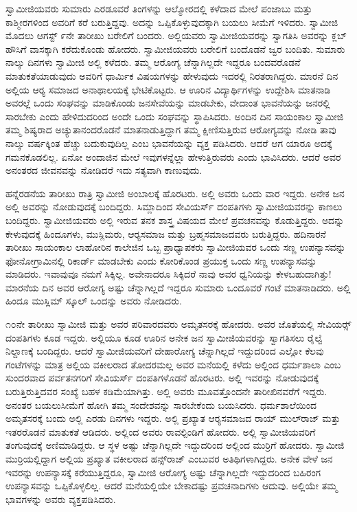  ಸ್ವಾಮೀಜಿಯವರು ಸುಮಾರು ಎರಡೂವರೆ ತಿಂಗಳನ್ನು ಆಲ್ಮೋರದಲ್ಲಿ ಕಳೆದಾದ ಮೇಲೆ ಪಂಜಾಬು ಮತ್ತು ಕಾಶ್ಮೀರಗಳಿಂದ ಅವರಿಗೆ ಕರೆ ಬರುತ್ತಿದ್ದವು. ಅದನ್ನು ಒಪ್ಪಿಕೊಳ್ಳುವುದಕ್ಕಾಗಿ ಬಯಲು ಸೀಮೆಗೆ ಇಳಿದರು. ಸ್ವಾಮೀಜಿ ಮೊದಲು ಆಗಸ್ಟ್ ೯ನೇ ತಾರೀಖು ಬರೇಲಿಗೆ ಬಂದರು. ಅಲ್ಲಿಯವರು ಸ್ವಾಮೀಜಿಯವರನ್ನು ಸ್ವಾಗತಿಸಿ ಅವರನ್ನು ಕ್ಲಬ್ ಹೌಸಿಗೆ ವಾಸಕ್ಕಾಗಿ ಕರೆದುಕೊಂಡು ಹೋದರು. ಸ್ವಾಮೀಜಿಯವರು ಬರೇಲಿಗೆ ಬಂದೊಡನೆ ಜ್ವರ ಬಂದಿತು. ಸುಮಾರು ನಾಲ್ಕು ದಿನಗಳು ಸ್ವಾಮೀಜಿ ಅಲ್ಲಿ ಕಳೆದರು. ತಮ್ಮ ಆರೋಗ್ಯ ಚೆನ್ನಾಗಿಲ್ಲದೇ ಇದ್ದರೂ ಬಂದವರೊಡನೆ ಮಾತುಕತೆಯಾಡುವುದು ಅವರಿಗೆ ಧಾರ್ಮಿಕ ವಿಷಯಗಳನ್ನು ಹೇಳುವುದು ಇದರಲ್ಲಿ ನಿರತರಾಗಿದ್ದರು. ಮಾರನೆ ದಿನ ಅಲ್ಲಿಯ ಆರ‍್ಯ ಸಮಾಜದ ಅನಾಥಾಲಯಕ್ಕೆ ಭೇಟಿಕೊಟ್ಟರು. ಆ ಊರಿನ ವಿದ್ಯಾರ್ಥಿಗಳನ್ನು ಉದ್ದೇಶಿಸಿ ಮಾತನಾಡಿ ಅವರಲ್ಲೆ ಒಂದು ಸಂಘವನ್ನು ಮಾಡಿಕೊಂಡು ಜನಸೇವೆಯನ್ನು ಮಾಡಬೇಕು, ವೇದಾಂತ ಭಾವನೆಯನ್ನು ಜನರಲ್ಲಿ ಸಾರಬೇಕು ಎಂದು ಹೇಳಿದುದರಿಂದ ಅಂದೇ ಒಂದು ಸಂಘವನ್ನು ಸ್ಥಾಪಿಸಿದರು. ಅಂದಿನ ದಿನ ಸಾಯಂಕಾಲ ಸ್ವಾಮೀಜಿ ತಮ್ಮ ಶಿಷ್ಯರಾದ ಅಚ್ಯುತಾನಂದರೊಡನೆ ಮಾತನಾಡುತ್ತಿದ್ದಾಗ ತಮ್ಮ ಕ್ಷೀಣಿಸುತ್ತಿರುವ ಆರೋಗ್ಯವನ್ನು ನೋಡಿ ತಾವು ನಾಲ್ಕು ವರ್ಷಕ್ಕಿಂತ ಹೆಚ್ಚು ಬದುಕುವುದಿಲ್ಲ ಎಂಬ ಭಾವನೆಯನ್ನು ವ್ಯಕ್ತ ಪಡಿಸಿದರು. ಆದರೆ ಆಗ ಯಾರೂ ಅದಕ್ಕೆ ಗಮನಕೊಡಲಿಲ್ಲ. ಏನೋ ಅಂದಾಜಿನ ಮೇಲೆ ಇವುಗಳನ್ನೆಲ್ಲಾ ಹೇಳುತ್ತಿರುವರು ಎಂದು ಭಾವಿಸಿದರು. ಆದರೆ ಅವರ ಅನಂತರದ ಜೀವನವನ್ನು ನೋಡಿದರೆ ಇದು ಸತ್ಯವಾಗಿ ಕಾಣುವುದು. 

 ಹನ್ನೆರಡನೆಯ ತಾರೀಖು ರಾತ್ರಿ ಸ್ವಾಮೀಜಿ ಅಂಬಾಲಕ್ಕೆ ಹೊರಟರು. ಅಲ್ಲಿ ಅವರು ಒಂದು ವಾರ ಇದ್ದರು. ಅನೇಕ ಜನ ಅಲ್ಲಿ ಅವರನ್ನು ನೋಡುವುದಕ್ಕೆ ಬಂದಿದ್ದರು. ಸಿಮ್ಲಾದಿಂದ ಸೇವಿಯರ್ಸ್ ದಂಪತಿಗಳು ಸ್ವಾಮೀಜಿಯವರನ್ನು ಕಾಣಲು ಬಂದಿದ್ದರು. ಸ್ವಾಮೀಜಿಯವರು ಅಲ್ಲಿ ಇರುವ ತನಕ ಶಾಸ್ತ್ರ ವಿಷಯದ ಮೇಲೆ ಪ್ರವಚನವನ್ನು ಕೊಡುತ್ತಿದ್ದರು. ಅದನ್ನು ಕೇಳುವುದಕ್ಕೆ ಹಿಂದೂಗಳು, ಮುಸ್ಲಿಮರು, ಆರ‍್ಯಸಮಾಜ ಮತ್ತು ಬ್ರಹ್ಮಸಮಾಜದವರು ಬರುತ್ತಿದ್ದರು. ಹದಿನಾರನೆ ತಾರೀಖು ಸಾಯಂಕಾಲ ಲಾಹೋರಿನ ಕಾಲೇಜಿನ ಒಬ್ಬ ಪ್ರಾಧ್ಯಾಪಕರು ಸ್ವಾಮೀಜಿಯವರ ಒಂದು ಸಣ್ಣ ಉಪನ್ಯಾಸವನ್ನು ಫೋನೋಗ್ರಾಮಿನಲ್ಲಿ ರಿಕಾರ್ಡ್ ಮಾಡಬೇಕು ಎಂದು ಕೋರಿಕೊಂಡ ಪ್ರಯುಕ್ತ ಒಂದು ಸಣ್ಣ ಉಪನ್ಯಾಸವನ್ನು ಮಾಡಿದರು. ಇವಾವುವೂ ನಮಗೆ ಸಿಕ್ಕಿಲ್ಲ. ಅವೇನಾದರೂ ಸಿಕ್ಕಿದರೆ ನಾವು ಅವರ ಧ್ವನಿಯನ್ನು ಕೇಳಬಹುದಾಗಿತ್ತು! ಮಾರನೆಯ ದಿನ ಅವರ ಆರೋಗ್ಯ ಅಷ್ಟು ಚೆನ್ನಾಗಿಲ್ಲದೆ ಇದ್ದರೂ ಸುಮಾರು ಒಂದೂವರೆ ಗಂಟೆ ಮಾತನಾಡಿದರು. ಅಲ್ಲಿ ಹಿಂದೂ ಮುಸ್ಲಿಮ್ ಸ್ಕೂಲ್ ಒಂದನ್ನು ಅವರು ನೋಡಿದರು. 

 ೧೦ನೇ ತಾರೀಖು ಸ್ವಾಮೀಜಿ ಮತ್ತು ಅವರ ಪರಿವಾರದವರು ಅಮೃತಸರಕ್ಕೆ ಹೋದರು. ಅವರ ಜೊತೆಯಲ್ಲಿ ಸೇವಿಯರ್ಸ್‍‍ ದಂಪತಿಗಳು ಕೂಡ ಇದ್ದರು. ಅಲ್ಲಿಯೂ ಕೂಡ ಊರಿನ ಅನೇಕ ಜನ ಸ್ವಾಮೀಜಿಯವರನ್ನು ಸ್ವಾಗತಿಸಲು ರೈಲ್ವೆ ನಿಲ್ದಾಣಕ್ಕೆ ಬಂದಿದ್ದರು. ಆದರೆ ಸ್ವಾಮೀಜಿಯವರಿಗೆ ದೇಹಾರೋಗ್ಯ ಚೆನ್ನಾಗಿಲ್ಲದೆ ಇದ್ದುದರಿಂದ ಎಲ್ಲೋ ಕೆಲವು ಗಂಟೆಗಳನ್ನು ಮಾತ್ರ ಅಲ್ಲಿಯ ವಕೀಲರಾದ ತೋದರಮಲ್ಲ ಅವರ ಮನೆಯಲ್ಲಿ ಕಳೆದು ಅಲ್ಲಿಂದ ಧರ್ಮಶಾಲಾ ಎಂಬ ಸುಂದರವಾದ ಪರ್ವತನಗರಿಗೆ ಸೇವಿಯರ್ಸ್ ದಂಪತಿಗಳೊಡನೆ ಹೊರಟರು. ಅಲ್ಲಿ ಇವರನ್ನು ನೋಡುವುದಕ್ಕೆ ಬರುತ್ತಿರುತ್ತಿದವರ ಸಂಖ್ಯೆ ಬಹಳ ಕಡಿಮೆಯಾಗಿತ್ತು. ಅಲ್ಲಿ ಅವರು ಮೂವತ್ತೊಂದನೇ ತಾರೀಖಿನವರೆಗೆ ಇದ್ದರು. ಅನಂತರ ಬಯಲುಸೀಮೆಗೆ ಹೋಗಿ ತಮ್ಮ ಸಂದೇಶವನ್ನು ಸಾರಬೇಕೆಂದು ಬಯಸಿದರು. ಧರ್ಮಶಾಲೆಯಿಂದ ಅಮೃತಸರಕ್ಕೆ ಬಂದು ಅಲ್ಲಿ ಎರಡು ದಿನಗಳು ಇದ್ದರು. ಅಲ್ಲಿ ಪ್ರಖ್ಯಾತ ಆರ‍್ಯಸಮಾಜದ ರಾಯ್ ಮುಲ್‍ರಾಜ್ ಮತ್ತು ಇತರರೊಡನೆ ಮಾತುಕತೆ ಆಡಿದರು. ಅಲ್ಲಿಂದ ಅವರು ರಾವಲ್ಪಿಂಡಿಗೆ ಹೋದರು. ಅಲ್ಲಿ ಸ್ವಾಮೀಜಿಯವರಿಗೆ ತಂಗುವುದಕ್ಕೆ ಅಣಿಮಾಡಿದ್ದರು. ಆ ಸ್ಥಳ ಅಷ್ಟು ಚೆನ್ನಾಗಿಲ್ಲದೇ ಇದ್ದುದರಿಂದ ಅಲ್ಲಿಂದ ಮುರ‍್ರಿಗೆ ಹೋದರು. ಸ್ವಾಮೀಜಿ ಮುರ‍್ರಿಯಲ್ಲಿದ್ದಾಗ ಅಲ್ಲಿಯ ಪ್ರಖ್ಯಾತ ವಕೀಲರಾದ ಹನ್ಸ್‌ರಾಜ್ ಎಂಬುವರ ಅತಿಥಿಗಳಾಗಿದ್ದರು. ಅನೇಕ ವೇಳೆ ಜನ ಇವರನ್ನು ಉಪನ್ಯಾಸಕ್ಕೆ ಕರೆಯುತ್ತಿದ್ದರೂ, ಸ್ವಾಮೀಜಿ ಆರೋಗ್ಯ ಅಷ್ಟು ಚೆನ್ನಾಗಿಲ್ಲದೇ ಇದ್ದುದರಿಂದ ಬಹಿರಂಗ ಉಪನ್ಯಾಸವನ್ನು ಒಪ್ಪಿಕೊಳ್ಳಲಿಲ್ಲ. ಆದರೆ ಮನೆಯಲ್ಲಿಯೇ ಬೇಕಾದಷ್ಟು ಪ್ರವಚನಾದಿಗಳು ಆದುವು. ಅಲ್ಲಿಯೇ ತಮ್ಮ ಭಾವಗಳನ್ನು ಅವರು ವ್ಯಕ್ತಪಡಿಸಿದರು. 

